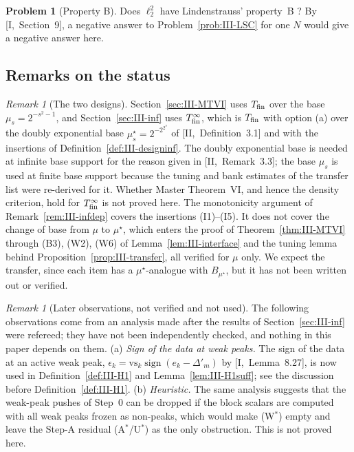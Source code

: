 \documentclass[10pt]{amsart}
\theoremstyle{definition}
\newtheorem{problem}[theorem]{Problem}
\theoremstyle{remark}
\newtheorem{remark}[theorem]{Remark}
\newcommand{\sgn}{\operatorname{sign}}
\begin{document}
\begin{problem}[Property B]\label{prob:III-B}
Does $\ell_2^2$ have Lindenstrauss' property~B \cite{Lindenstrauss}?  By
[I,~Section~9], a negative answer to Problem~\textup{\ref{prob:III-LSC}} for one
$N$ would give a negative answer here.
\end{problem}

\subsection{Remarks on the status}
\begin{remark}[The two designs]\label{rem:III-twodesigns}
Section~\ref{sec:III-MTVI} uses $T_{\rm fin}$ over the base
$\mu_s=2^{-s^2-1}$, and Section~\ref{sec:III-inf} uses $T^\infty_{\rm fin}$,
which is $T_{\rm fin}$ with option (a) over the doubly exponential base
$\mu^\star_s=2^{-2^{2^s}}$ of [II,~Definition~3.1] and with the insertions of
Definition~\ref{def:III-designinf}.  The doubly exponential base is needed
at infinite base support for the reason given in [II,~Remark~3.3]; the base
$\mu_s$ is used at finite base support because the tuning and bank estimates
of the transfer list were re-derived for it.  Whether Master Theorem~VI, and
hence the density criterion, hold for $T^\infty_{\rm fin}$ is not proved
here.  The monotonicity argument of Remark~\ref{rem:III-infdep} covers the
insertions (I1)--(I5).  It does not cover the change of base from $\mu$ to
$\mu^\star$, which enters the proof of Theorem~\ref{thm:III-MTVI} through
(B3), (W2), (W6) of Lemma~\ref{lem:III-interface} and the tuning lemma
behind Proposition~\ref{prop:III-transfer}, all verified for $\mu$ only.
We expect the transfer, since each item has a $\mu^\star$-analogue with
$B_{\mu^\star}$, but it has not been written out or verified.
\end{remark}

\begin{remark}[Later observations, not verified and not used]\label{rem:III-later}
The following observations come from an analysis made after the results of
Section~\ref{sec:III-inf} were refereed; they have not been independently
checked, and nothing in this paper depends on them.
(a) \emph{Sign of the data at weak peaks.}  The sign of the data at an
active weak peak, $\epsilon_k=\mathrm{vs}_k\sgn(e_k-\Delta'_m)$ by
[I,~Lemma~8.27], is now used in Definition~\ref{def:III-H1} and
Lemma~\ref{lem:III-H1suff}; see the discussion before
Definition~\ref{def:III-H1}.
(b) \emph{Heuristic.}  The same analysis suggests that the weak-peak pushes
of Step~$0$ can be dropped if the block scalars are computed with all weak
peaks frozen as non-peaks, which would make (W$^*$) empty and leave the
Step-A residual (A$^*$/U$^*$) as the only obstruction.  This is not proved
here.
\end{remark}
\end{document}
